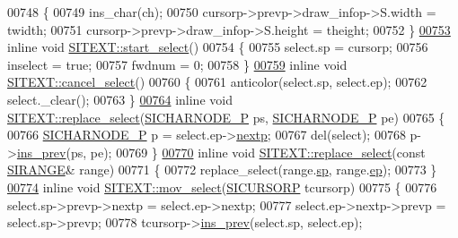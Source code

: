 \begin{DoxyCode}
00748 \{
00749     ins\_char(ch);
00750     cursorp->prevp->draw\_infop->S.width = twidth;
00751     cursorp->prevp->draw\_infop->S.height = theight;
00752 \}
\hyperlink{class_s_i_t_e_x_t_a64816d0a3be43c67522eb09cd6b4eb94}{00753} \textcolor{keyword}{inline} \textcolor{keywordtype}{void} \hyperlink{class_s_i_t_e_x_t_a64816d0a3be43c67522eb09cd6b4eb94}{SITEXT::start\_select}()
00754 \{
00755     select.sp = cursorp;
00756     inselect = \textcolor{keyword}{true};
00757     fwdnum = 0;
00758 \}
\hyperlink{class_s_i_t_e_x_t_a3a942ca324f4c37a4d747ba7a91a293b}{00759} \textcolor{keyword}{inline} \textcolor{keywordtype}{void} \hyperlink{class_s_i_t_e_x_t_a3a942ca324f4c37a4d747ba7a91a293b}{SITEXT::cancel\_select}()
00760 \{
00761     anticolor(select.sp, select.ep);
00762     select.\_clear();
00763 \}
\hyperlink{class_s_i_t_e_x_t_ac2480043349d0c611a717c87ffbc6415}{00764} \textcolor{keyword}{inline} \textcolor{keywordtype}{void} \hyperlink{class_s_i_t_e_x_t_a5919f6a8ad7413503660035259a84fbe}{SITEXT::replace\_select}(\hyperlink{class_s_i_c_h_a_r_n_o_d_e}{SICHARNODE\_P} ps, 
      \hyperlink{class_s_i_c_h_a_r_n_o_d_e}{SICHARNODE\_P} pe)
00765 \{
00766     \hyperlink{class_s_i_c_h_a_r_n_o_d_e}{SICHARNODE\_P} p = select.ep->\hyperlink{class_s_i_c_h_a_r_n_o_d_e_ab188ae5c7731bcc66a1042defcf158c8}{nextp};
00767     del(select);
00768     p->\hyperlink{class_s_i_c_h_a_r_n_o_d_e_a0aba68c10438db18bea07bb77d70f839}{ins\_prev}(ps, pe);
00769 \}
\hyperlink{class_s_i_t_e_x_t_a5919f6a8ad7413503660035259a84fbe}{00770} \textcolor{keyword}{inline} \textcolor{keywordtype}{void} \hyperlink{class_s_i_t_e_x_t_a5919f6a8ad7413503660035259a84fbe}{SITEXT::replace\_select}(\textcolor{keyword}{const} \hyperlink{struct_s_i_r_a_n_g_e}{SIRANGE}& range)
00771 \{
00772     replace\_select(range.\hyperlink{struct_s_i_r_a_n_g_e_a7acdf296d873d6ed6fc203674109b715}{sp}, range.\hyperlink{struct_s_i_r_a_n_g_e_aaa89b5ae16be7b890eba048bc212feec}{ep});
00773 \}
\hyperlink{class_s_i_t_e_x_t_abb0fb0438be292cc363813dece5b6258}{00774} \textcolor{keyword}{inline} \textcolor{keywordtype}{void} \hyperlink{class_s_i_t_e_x_t_abb0fb0438be292cc363813dece5b6258}{SITEXT::mov\_select}(\hyperlink{class_s_i_c_h_a_r_n_o_d_e}{SICURSORP} tcursorp)
00775 \{
00776     select.sp->prevp->nextp = select.ep->nextp;
00777     select.ep->nextp->prevp = select.sp->prevp;
00778     tcursorp->\hyperlink{class_s_i_c_h_a_r_n_o_d_e_a0aba68c10438db18bea07bb77d70f839}{ins\_prev}(select.sp, select.ep);

\end{DoxyCode}
